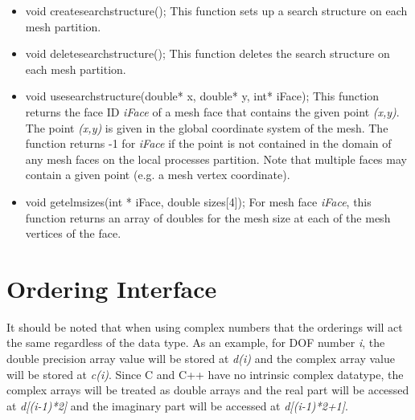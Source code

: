 \begin{itemize}
\item void createsearchstructure(); This function sets up a search structure on each mesh partition.  
\item void deletesearchstructure(); This function deletes the search structure on each mesh partition.
\item void usesearchstructure(double* x, double* y, int* iFace); This function returns the face ID \textit{iFace}
of a mesh face that contains the given point \textit{(x,y)}.  The point \textit{(x,y)} is given in the
global coordinate system of the mesh.  The function returns -1 for \textit{iFace} if the point is not contained
in the domain of any mesh faces on the local processes partition.  Note  that multiple faces may contain
a given point (e.g. a mesh vertex coordinate).
\item void getelmsizes(int * iFace, double sizes[4]); For mesh face \textit{iFace}, this function returns an array
of doubles for the mesh size at each of the mesh vertices of the face.  
\end{itemize}





\section{Ordering Interface}
It should be noted that when using complex numbers that the orderings will act the same regardless
of the data type. As an example, for DOF number \textit{i}, the double precision array value will 
be stored at \textit{d(i)} and the complex array value will be stored at \textit{c(i)}.  Since
C and C++ have no intrinsic complex datatype, the complex arrays will be treated as double arrays
and the real part will be accessed at \textit{d[(i-1)*2]} and the imaginary part will be
accessed at \textit{d[(i-1)*2+1]}.

